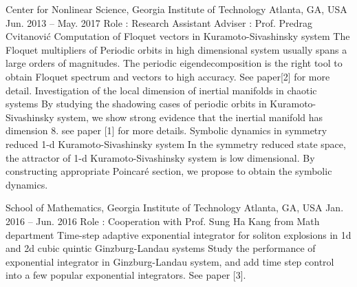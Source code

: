 


\begin{cventries}
  \cvresearch
  {Center for Nonlinear Science, Georgia Institute of Technology}
  {Atlanta, GA, USA}
  {Jun. 2013 -- May. 2017}
  {Role : Research Assistant \quad Adviser : Prof. Predrag Cvitanovi\'c }
  {
    \cvresearchitem
    {Computation of Floquet vectors in Kuramoto-Sivashinsky system}
    {The Floquet multipliers of Periodic orbits in high dimensional system usually spans a large orders of magnitudes. The periodic eigendecomposition is the right tool to obtain Floquet spectrum and vectors to high accuracy. See paper[2] for more detail.}
    \cvresearchitem
    {Investigation of the local dimension of inertial manifolds in chaotic systems}
    {By studying the shadowing cases of periodic orbits in        Kuramoto-Sivashinsky system, we show strong evidence that the inertial manifold has dimension 8. see paper [1] for more details. }
    \cvresearchitem
    {Symbolic dynamics in symmetry reduced 1-d Kuramoto-Sivashinsky system}
    {In the symmetry reduced state space, the attractor of  1-d Kuramoto-Sivashinsky system is low dimensional. By constructing appropriate Poincar\'e section, we propose to obtain the symbolic dynamics.}
  }

  \cvresearch
  {School of Mathematics, Georgia Institute of Technology} 
  {Atlanta, GA, USA}
  {Jan. 2016 -- Jun. 2016} 
  {Role : Cooperation with Prof. Sung Ha Kang from Math department}
  {
    \cvresearchitem
    {Time-step adaptive exponential integrator for soliton explosions in 1d and 2d cubic quintic Ginzburg-Landau systems}
    {Study the performance of exponential integrator in Ginzburg-Landau system,      and add time step control into a few popular exponential integrators. See paper [3].}
  }


\end{cventries}

